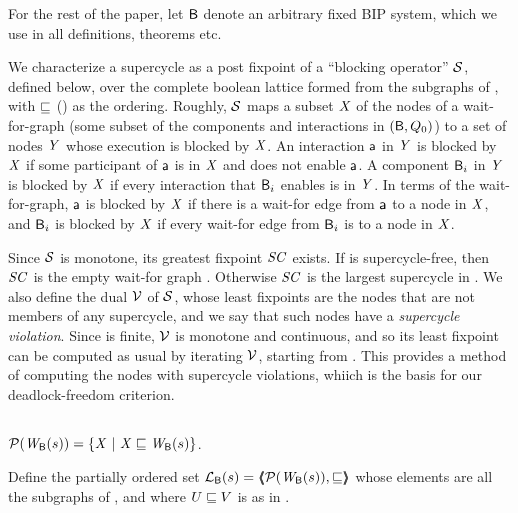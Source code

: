 For the rest of the paper, let $\mathsf{B}$ denote an arbitrary fixed BIP system, which
we use in all definitions, theorems etc.

We characterize a supercycle as a post fixpoint of a ``blocking operator'' $\mathcal{S}$, defined below, over the complete boolean lattice formed from the
subgraphs of , with $\sqsubseteq$ () as the ordering.
%
Roughly, $\mathcal{S}$ maps a subset $\mathit{X}$ of the nodes of a wait-for-graph (\ie some subset of the components and interactions in $(\mathsf{B}, Q_0)$)
to a set of nodes $\mathit{Y}$ whose execution is blocked by $\mathit{X}$. An interaction $\mathsf{a}$ in $\mathit{Y}$ is blocked by $\mathit{X}$ if some participant of $\mathsf{a}$ is in $\mathit{X}$ and does
not enable $\mathsf{a}$. A component $\mathsf{B}_i$  in $\mathit{Y}$ is blocked by $\mathit{X}$ if every interaction that $\mathsf{B}_i$ enables is in $\mathit{Y}$. In terms of the wait-for-graph, 
$\mathsf{a}$ is blocked by $\mathit{X}$ if there is a wait-for edge from $\mathsf{a}$ to a node in $\mathit{X}$, and $\mathsf{B}_i$ is blocked by $\mathit{X}$ if every wait-for edge from $\mathsf{B}_i$ is to a
node in $\mathit{X}$. 

Since $\mathcal{S}$ is monotone, its greatest fixpoint $\mathit{SC}$ exists.  If  is supercycle-free, then $\mathit{SC}$ is the empty wait-for graph \ewfg.
Otherwise $\mathit{SC}$ is the largest supercycle in .  We also define the dual $\mathcal{V}$ of $\mathcal{S}$, whose least fixpoints are the nodes that are not
members of any supercycle, and we say that such nodes have a \emph{supercycle violation}. Since  is finite, 
$\mathcal{V}$ is monotone and continuous, and so its least fixpoint can be computed as usual by iterating $\mathcal{V}$, starting from \ewfg.
This provides a method of computing the nodes with supercycle violations, whiich is the basis for our deadlock-freedom criterion.



\subsection{}
\label{secn:supercycle-fixpoint}

\begin{definition} \label{defn:wsetOfSubgraphs}
$\mathcal{P}(\mathit{W}_{\mathsf{B}}({s})) = \{  \mathit{X} ~|~ \mathit{X} \sqsubseteq \mathit{W}_{\mathsf{B}}({s})  \}$.
\end{definition}


\begin{definition} \label{defn:wflattice}
Define the partially ordered set $\mathcal{L}_{\mathsf{B}}({s}) = \langle \hspace{-0.34em} \langle \hspace{-0.34em} \langle  \mathcal{P}(\mathit{W}_{\mathsf{B}}({s})), \sqsubseteq  \rangle \hspace{-0.34em} \rangle \hspace{-0.34em} \rangle$ %
whose elements are all the subgraphs of 
, and where  $U \sqsubseteq V$ is as in .   
\end{definition}

